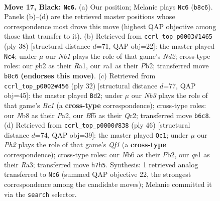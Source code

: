 \documentclass[11pt]{article}
\begin{document}
\clearpage

\begin{figure}[p]\centering
\begin{subfigure}{0.46\textwidth}\centering
\resizebox{\linewidth}{!}{%
\newchessgame
\chessboard[
  setfen={rn4k1/pp3pbp/1n3qp1/3p1b2/3P4/1B5P/PPN2PP1/RNB1Q1K1 b - - 0 17},
  showmover=false,
  pgfstyle=straightmove, color=movearrow, markmove={b8-c6}
]}
\caption{}
\end{subfigure}\hfill
\begin{subfigure}{0.46\textwidth}\centering
\resizebox{\linewidth}{!}{%
\newchessgame
\chessboard[
  setfen={r2q1bk1/pb3ppp/n2p4/2pP4/4B3/P1N3P1/1P1N1P1P/R3Q1K1 w - - 1 20},
  showmover=false,
  pgfstyle=straightmove, color=movearrow, markmove={d2-c4}
]}
\caption{}
\end{subfigure}
\\[4pt]
\begin{subfigure}{0.46\textwidth}\centering
\resizebox{\linewidth}{!}{%
\newchessgame
\chessboard[
  setfen={r3q1k1/pbp1bpp1/1p4np/3n4/1PNN4/2P5/P1Q2PPP/R1B2BK1 w - - 3 17},
  showmover=false,
  pgfstyle=straightmove, color=movearrow, markmove={c1-d2}
]}
\caption{}
\end{subfigure}\hfill
\begin{subfigure}{0.46\textwidth}\centering
\resizebox{\linewidth}{!}{%
\newchessgame
\chessboard[
  setfen={3q1bk1/r4p2/p2p1npp/P1pP1b2/2B5/R1N4P/1P1B1PP1/5QK1 w - - 3 24},
  showmover=false,
  pgfstyle=straightmove, color=movearrow, markmove={f1-c1}
]}
\caption{}
\end{subfigure}
\caption{\textbf{Move 17, Black: \texttt{Nc6}.} (a) Our position; Melanie plays \texttt{Nc6} (\texttt{b8c6}). Panels (b)--(d) are the retrieved master positions whose correspondence most drove this move (highest QAP objective among those that transfer to it). (b) Retrieved from \texttt{ccrl\_top\_p0003\#1465} (ply 38) [structural distance $d$=71, QAP obj=22]: the master played \texttt{Nc4}; under $\mu$ our \emph{Nb1} plays the role of that game's \emph{Nd2}; cross-type roles: our \emph{p}b2 as their \emph{R}a1, our \emph{r}a1 as their \emph{P}b2; transferred move \texttt{b8c6} \textbf{(endorses this move)}. (c) Retrieved from \texttt{ccrl\_top\_p0002\#456} (ply 32) [structural distance $d$=77, QAP obj=45]: the master played \texttt{Bd2}; under $\mu$ our \emph{Nb3} plays the role of that game's \emph{Bc1} (a \textbf{cross-type} correspondence); cross-type roles: our \emph{N}b8 as their \emph{P}a2, our \emph{B}f5 as their \emph{Q}c2; transferred move \texttt{b6c8}. (d) Retrieved from \texttt{ccrl\_top\_p0000\#838} (ply 46) [structural distance $d$=74, QAP obj=39]: the master played \texttt{Qc1}; under $\mu$ our \emph{Ph2} plays the role of that game's \emph{Qf1} (a \textbf{cross-type} correspondence); cross-type roles: our \emph{N}b6 as their \emph{P}b2, our \emph{q}e1 as their \emph{R}a3; transferred move \texttt{h7h5}. Synthesis: 1 retrieved analog transferred to \texttt{Nc6} (summed QAP objective 22, the strongest correspondence among the candidate moves); Melanie committed it via the \texttt{search} selector.}
\label{fig:thought-m33}
\end{figure}
\end{document}
